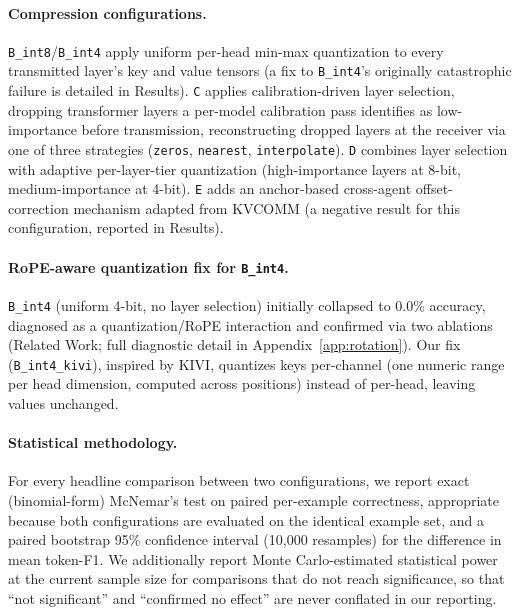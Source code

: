 \documentclass[11pt]{article}
\begin{document}
\paragraph{Compression configurations.} \texttt{B\_int8}/\texttt{B\_int4}
apply uniform per-head min-max quantization to every transmitted layer's
key and value tensors (a fix to \texttt{B\_int4}'s originally catastrophic
failure is detailed in Results). \texttt{C} applies calibration-driven
layer selection, dropping transformer layers a per-model calibration pass
identifies as low-importance before transmission, reconstructing dropped
layers at the receiver via one of three strategies (\texttt{zeros},
\texttt{nearest}, \texttt{interpolate}). \texttt{D} combines layer
selection with adaptive per-layer-tier quantization (high-importance
layers at 8-bit, medium-importance at 4-bit). \texttt{E} adds an
anchor-based cross-agent offset-correction mechanism adapted from KVCOMM
(a negative result for this configuration, reported in Results).

\paragraph{RoPE-aware quantization fix for \texttt{B\_int4}.}
\texttt{B\_int4} (uniform 4-bit, no layer selection) initially collapsed
to 0.0\% accuracy, diagnosed as a quantization/RoPE interaction and
confirmed via two ablations (Related Work; full diagnostic detail in
Appendix~\ref{app:rotation}). Our fix (\texttt{B\_int4\_kivi}), inspired
by KIVI, quantizes keys per-channel (one numeric range per head
dimension, computed across positions) instead of per-head, leaving
values unchanged.

\paragraph{Statistical methodology.} For every headline comparison
between two configurations, we report exact (binomial-form) McNemar's
test on paired per-example correctness, appropriate because both
configurations are evaluated on the identical example set, and a paired
bootstrap 95\% confidence interval (10,000 resamples) for the difference
in mean token-F1. We additionally report Monte Carlo-estimated statistical
power at the current sample size for comparisons that do not reach
significance, so that ``not significant'' and ``confirmed no effect'' are
never conflated in our reporting.
\end{document}
